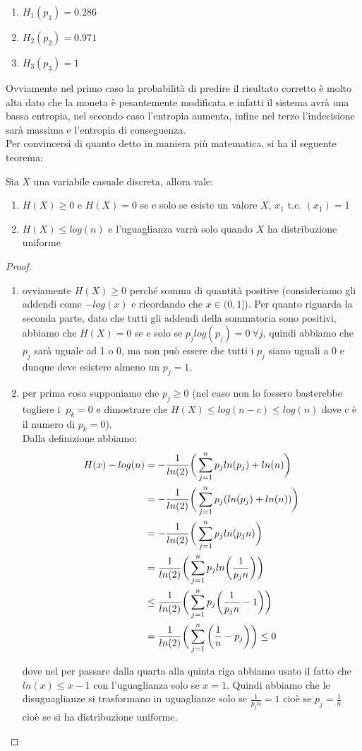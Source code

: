 \begin{enumerate}
\item$H_1(p_1)=0.286$
\item$H_2(p_2)=0.971$
\item$H_3(p_3)=1$
\end{enumerate}
Ovviamente nel primo caso la probabilità di predire il risultato corretto è molto alta dato che la moneta è pesantemente modificata e infatti il sistema avrà una bassa entropia, nel secondo caso l'entropia aumenta, infine nel terzo l'indecisione sarà massima e l'entropia di conseguenza.\\
Per convincersi di quanto detto in maniera più matematica, si ha il seguente teorema:
\begin{teo} \label{teo:6.2}
Sia $X$ una variabile casuale discreta, allora vale:
\begin{enumerate}
\item $H(X)\geq 0$ e $H(X)= 0$ se e solo se esiste un valore $X$, $x_1$ t.c. \p$(x_1)=1$
\item $H(X)\leq log(n)$ e l'uguaglianza varrà solo quando $X$ ha distribuzione uniforme
\end{enumerate}
\end{teo}
\begin{proof} \leavevmode 
\begin{enumerate}
\item ovviamente $H(X)\geq 0$ perché somma di quantità positive (consideriamo gli addendi come $-log(x)$ e ricordando che $x\in (0,1]$). Per quanto riguarda la seconda parte, dato che tutti gli addendi della sommatoria sono positivi, abbiamo che $H(X)=0$ se e solo se $p_jlog(p_j)=0 \  \forall j$, quindi abbiamo che $p_j$ sarà uguale ad 1 o 0, ma non può essere che tutti i $p_j$ siano  uguali a 0 e dunque deve esistere almeno un $p_j=1$.
\item  per prima cosa supponiamo che $p_j\ge 0$ (nel caso non lo fossero basterebbe togliere i $\  p_k=0$ e dimostrare che $H(X)\leq log(n-c)\leq log(n)$ dove $c$ è il numero di $p_k=0$).\\
Dalla definizione abbiamo:
\[
\begin{split}
H(x)-log(n)
&=-\frac{1}{ln(2)} \bigg( \sum_{j=1}^n p_j ln (p_j) + ln(n) \bigg)\\
&=-\frac{1}{ln(2)} \bigg( \sum_{j=1}^n p_j (ln (p_j) + ln(n)) \bigg)\\
&=-\frac{1}{ln(2)} \bigg( \sum_{j=1}^n p_j ln(p_jn)\bigg)\\
&=\frac{1}{ln(2)} \bigg( \sum_{j=1}^n p_j ln \bigg( \frac{1}{p_jn} \bigg) \bigg)\\
&\leq \frac{1}{ln(2)} \bigg( \sum_{j=1}^n p_j \bigg( \frac{1}{p_jn} -1 \bigg) \bigg)\\
&= \frac{1}{ln(2)} \bigg( \sum_{j=1}^n \bigg( \frac{1}{n} -p_j \bigg) \bigg) \leq 0
\end{split}
\]


dove nel per passare dalla quarta alla quinta riga abbiamo usato il fatto che $ln(x)\leq x-1$ con l'uguaglianza solo se $x=1$. Quindi abbiamo che le disuguaglianze si trasformano in uguaglianze solo se $\frac{1}{p_jn}=1$ cioè se $p_j=\frac{1}{n}$ cioè se si ha distribuzione uniforme.
\end{enumerate}
\end{proof}


